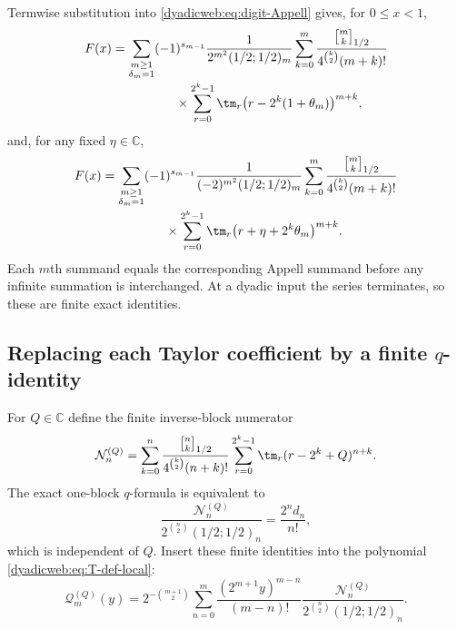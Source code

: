 \documentclass[11pt,oneside]{article}
\theoremstyle{definition}
\theoremstyle{remark}
\newcommand{\C}{\mathbb C}
\newcommand{\qbinom}[3]{\genfrac{[}{]}{0pt}{}{#1}{#2}_{#3}}
\begin{document}
Termwise substitution into \eqref{dyadicweb:eq:digit-Appell} gives, for $0\le x<1$,
\begin{align}
 F(x)&=\sum_{\substack{m\ge1\\\delta_m=1}}
 (-1)^{s_{m-1}}
 \frac1{2^{m^2}(1/2;1/2)_m}
 \sum_{k=0}^{m}\frac{\qbinom mk{1/2}}{4^{\binom k2}(m+k)!}\notag\\[-0.2em]
 &\hspace{5em}\times
 \sum_{r=0}^{2^k-1}\tm_r\bigl(r-2^k(1+\theta_m)\bigr)^{m+k},
 \label{dyadicq:eq:centered-digit-q}
\end{align}
and, for any fixed $\eta\in\C$,
\begin{align}
 F(x)&=\sum_{\substack{m\ge1\\\delta_m=1}}
 (-1)^{s_{m-1}}
 \frac1{(-2)^{m^2}(1/2;1/2)_m}
 \sum_{k=0}^{m}\frac{\qbinom mk{1/2}}{4^{\binom k2}(m+k)!}\notag\\[-0.2em]
 &\hspace{5em}\times
 \sum_{r=0}^{2^k-1}\tm_r\bigl(r+\eta+2^k\theta_m\bigr)^{m+k}.
 \label{dyadicq:eq:raw-digit-q}
\end{align}
Each $m$th summand equals the corresponding Appell summand before any infinite summation is
interchanged.  At a dyadic input the series terminates, so these are finite exact identities.

\subsection[Replacing each Taylor coefficient by a finite q-identity]{Replacing each Taylor coefficient by a finite $q$-identity}

For $Q\in\C$ define the finite inverse-block numerator
\begin{equation}
 \mathcal N_n^{(Q)}=
 \sum_{k=0}^{n}
 \frac{\qbinom nk{1/2}}{4^{\binom k2}(n+k)!}
 \sum_{r=0}^{2^k-1}\tm_r(r-2^k+Q)^{n+k}.                  \label{dyadicweb:eq:NnQ-local}
\end{equation}
The exact one-block $q$-formula is equivalent to
\begin{equation}
 \frac{\mathcal N_n^{(Q)}}
 {2^{\binom n2}(1/2;1/2)_n}
 =\frac{2^nd_n}{n!},                                      \label{dyadicweb:eq:NnQ-normalization-local}
\end{equation}
which is independent of $Q$.  Insert these finite identities into the polynomial
\eqref{dyadicweb:eq:T-def-local}:
\begin{equation}
 \mathcal Q_m^{(Q)}(y)=
 2^{-\binom{m+1}{2}}
 \sum_{n=0}^{m}
 \frac{(2^{m+1}y)^{m-n}}{(m-n)!}
 \frac{\mathcal N_n^{(Q)}}
 {2^{\binom n2}(1/2;1/2)_n}.                              \label{dyadicweb:eq:QmQ-local}
\end{equation}
\end{document}
